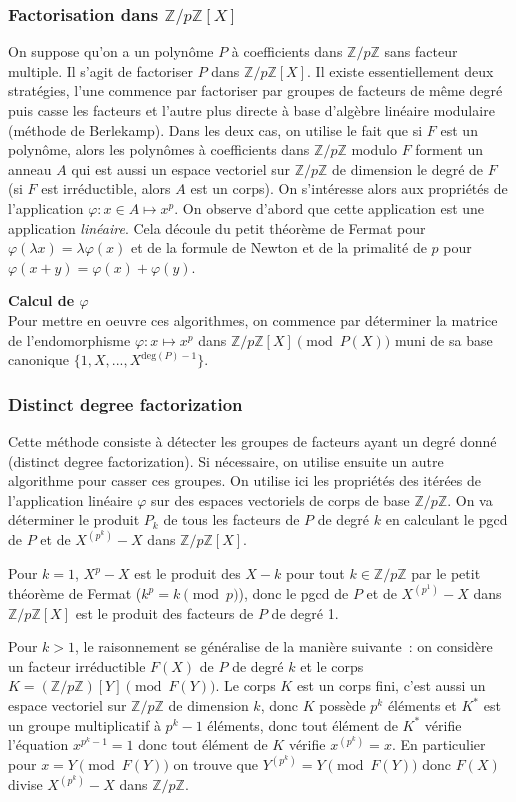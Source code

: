 \documentclass[a4paper,11pt]{article}
\newcommand{\Z}{{\mathbb{Z}}}
\begin{document}
\subsubsection{Factorisation dans $\Z/p\Z[X]$}
On suppose qu'on a un polynôme $P$ à coefficients dans $\Z/p\Z$ sans
facteur multiple. Il s'agit de factoriser $P$ dans $\Z/p\Z[X]$.
Il existe essentiellement deux stratégies, l'une commence par factoriser par
groupes de facteurs de même degré puis casse les facteurs et l'autre 
plus directe à base d'algèbre linéaire modulaire (méthode de Berlekamp). 
Dans les deux cas, on utilise le fait que si $F$ est un polynôme, 
alors les polynômes à coefficients dans $\Z/p\Z$
modulo $F$ forment un anneau $A$ qui est aussi un espace vectoriel 
sur $\Z/p\Z$ de dimension le degré de $F$ 
(si $F$ est irréductible, alors $A$ est un corps).
On s'intéresse alors aux propriétés de l'application 
$\varphi: x \in A \mapsto x^p$.
On observe d'abord que cette application est une application {\em linéaire\/}.
Cela découle du petit théorème de Fermat pour $\varphi(\lambda x)=\lambda
\varphi(x)$ et de la formule de Newton et de la primalité de $p$ pour
$\varphi(x+y)=\varphi(x)+\varphi(y)$.

{\bf Calcul de $\varphi$}\\
Pour mettre en oeuvre ces algorithmes, on commence par déterminer la matrice
de l'endomorphisme $\varphi: x \mapsto x^p$ dans $\Z/p\Z[X] \pmod {P(X)}$
muni de sa base canonique $\{ 1, X,...,X^{\mbox{deg}(P)-1} \}$.

\subsubsection{Distinct degree factorization} 
Cette méthode consiste à détecter les groupes de facteurs
ayant un degré donné (distinct degree factorization). Si nécessaire, 
on utilise ensuite un autre algorithme pour casser ces groupes.
On utilise ici les propriétés des itérées de l'application linéaire 
$\varphi$ sur des espaces vectoriels de corps de base $\Z/p\Z$.
On va déterminer le produit $P_k$ de tous les facteurs de $P$ de degré $k$
en calculant le pgcd de $P$ et de $X^{(p^k)}-X$ dans $\Z/p\Z[X]$.

Pour $k=1$, $X^p-X$ est le produit des $X-k$ pour tout $k\in \Z/p\Z$
par le petit théorème de Fermat ($k^p=k \pmod p$), donc le pgcd
de $P$ et de $X^{(p^1)}-X$ dans $\Z/p\Z[X]$ est le produit des facteurs
de $P$ de degré 1.

Pour $k>1$, le raisonnement se généralise de la manière suivante~: on
considère un facteur irréductible $F(X)$ de $P$ de degré $k$ et le corps
$K=(\Z/p\Z)[Y] \pmod{F(Y)}$. Le corps $K$ est un corps fini, c'est
aussi un espace vectoriel sur $\Z/p\Z$ de dimension $k$, donc $K$ possède
$p^k$ éléments et $K^*$ est un groupe multiplicatif à $p^k-1$ éléments,
donc tout élément de $K^*$ vérifie l'équation $x^{p^k-1}=1$ donc
tout élément de $K$ vérifie $x^{(p^k)}=x$. En particulier pour 
$x=Y \pmod {F(Y)}$ 
on trouve que $Y^{(p^k)}=Y \pmod {F(Y)}$ donc $F(X)$ divise $X^{(p^k)}-X$
dans $\Z/p\Z$.
\end{document}
